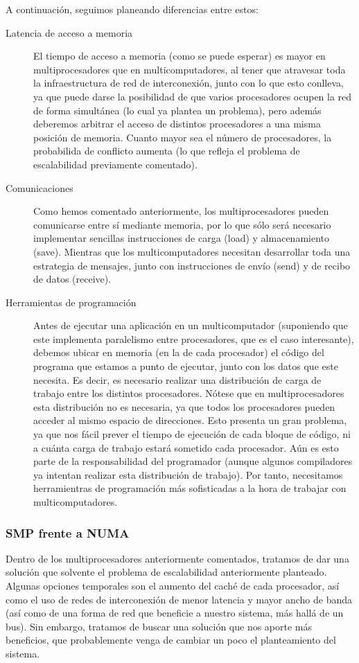 A continuación, seguimos planeando diferencias entre estos:
\begin{description}
    \item [Latencia de acceso a memoria]
        El tiempo de acceso a memoria (como se puede esperar) es mayor en multiprocesadores que en multicomputadores, al tener que atravesar toda la infraestructura de red de interconexión, junto con lo que esto conlleva, ya que puede darse la posibilidad de que varios procesadores ocupen la red de forma simultánea (lo cual ya plantea un problema), pero además deberemos arbitrar el acceso de distintos procesadores a una misma posición de memoria. Cuanto mayor sea el número de procesadores, la probabilida de conflicto aumenta (lo que refleja el problema de escalabilidad previamente comentado). 
    \item [Comunicaciones]
        Como hemos comentado anteriormente, los multiprocesadores pueden comunicarse entre sí mediante memoria, por lo que sólo será necesario implementar sencillas instrucciones de carga (load) y almacenamiento (save). Mientras que los multicomputadores necesitan desarrollar toda una estrategia de mensajes, junto con instrucciones de envío (send) y de recibo de datos (receive). 
    \item [Herramientas de programación]
        Antes de ejecutar una aplicación en un multicomputador (suponiendo que este implementa paralelismo entre procesadores, que es el caso interesante), debemos ubicar en memoria (en la de cada procesador) el código del programa que estamos a punto de ejecutar, junto con los datos que este necesita. Es decir, es necesario realizar una distribución de carga de trabajo entre los distintos procesadores. Nótese que en multiprocesadores esta distribución no es necesaria, ya que todos los procesadores pueden acceder al mismo espacio de direcciones. Esto presenta un gran problema, ya que nos fácil prever el tiempo de ejecución de cada bloque de código, ni a cuánta carga de trabajo estará sometido cada procesador. Aún es esto parte de la responsabilidad del programador (aunque algunos compiladores ya intentan realizar esta distribución de trabajo). Por tanto, necesitamos herramientras de programación más sofisticadas a la hora de trabajar con multicomputadores.
\end{description}

\subsubsection{SMP frente a NUMA}
Dentro de los multiprocesadores anteriormente comentados, tratamos de dar una solución que solvente el problema de escalabilidad anteriormente planteado. Algunas opciones temporales son el aumento del caché de cada procesador, así como el uso de redes de interconexión de menor latencia y mayor ancho de banda (así como de una forma de red que beneficie a nuestro sistema, más hallá de un bus). Sin embargo, tratamos de buscar una solución que nos aporte más beneficios, que probablemente venga de cambiar un poco el planteamiento del sistema.

